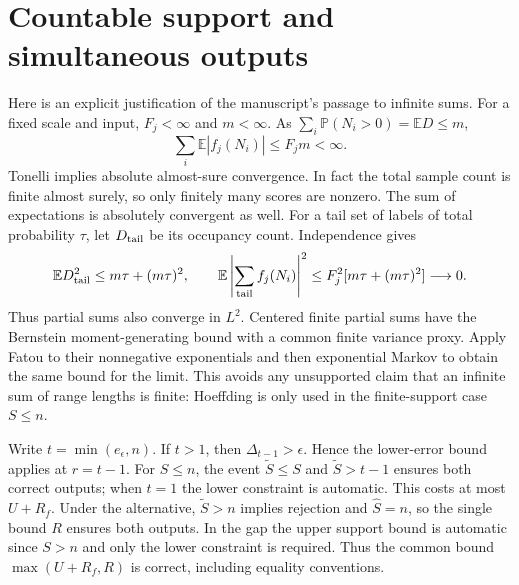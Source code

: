 \documentclass[10pt]{article}
\newcommand{\E}{\mathbb E}
\newcommand{\Prb}{\mathbb P}
\begin{document}
\section{Countable support and simultaneous outputs}
Here is an explicit justification of the manuscript's passage to infinite
sums. For a fixed scale and input, $F_j<\infty$ and $m<\infty$.
As $\sum_i\Prb(N_i>0)=\E D\le m$,
\[
\sum_i\E|f_j(N_i)|\le F_jm<\infty.
\]
Tonelli implies absolute almost-sure convergence. In fact the total
sample count is finite almost surely, so only finitely many scores are
nonzero. The sum of expectations is absolutely convergent as well.
For a tail set of labels of total probability $\tau$, let $D_{\rm tail}$
be its occupancy count. Independence gives
\[
\E D_{\rm tail}^2\le m\tau+(m\tau)^2,\qquad
\E\left|\sum_{\rm tail}f_j(N_i)\right|^2
 \le F_j^2[m\tau+(m\tau)^2]\longrightarrow0.
\]
Thus partial sums also converge in $L^2$. Centered finite partial sums
have the Bernstein moment-generating bound with a common finite variance
proxy. Apply Fatou to their nonnegative exponentials and then exponential
Markov to obtain the same bound for the limit. This avoids any unsupported
claim that an infinite sum of range lengths is finite: Hoeffding is only
used in the finite-support case $S\le n$.

Write $t=\min(e_\epsilon,n)$. If $t>1$, then
$\Delta_{t-1}>\epsilon$. Hence the lower-error bound applies at $r=t-1$.
For $S\le n$, the event
$\widetilde S\le S$ and $\widetilde S>t-1$ ensures both correct outputs;
when $t=1$ the lower constraint is automatic. This costs at most $U+R_f$.
Under the alternative, $\widetilde S>n$ implies rejection and
$\widehat S=n$, so the single bound $R$ ensures both outputs. In the gap
the upper support bound is automatic since $S>n$ and only the lower
constraint is required. Thus the common bound
$\max(U+R_f,R)$ is correct, including equality conventions.
\end{document}
